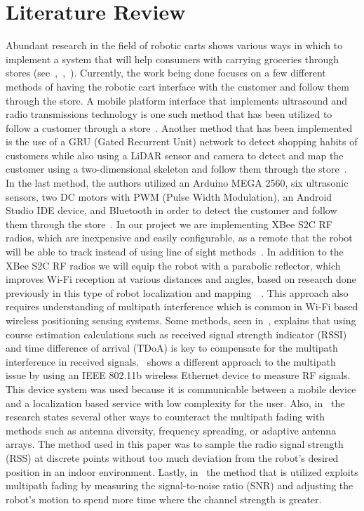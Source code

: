\documentclass[letterpaper,12pt]{article}   %
\begin{document}
\section{Literature Review}
Abundant research in the field of robotic carts shows various ways in which to implement a system that will help consumers with carrying groceries through stores (see~\cite{Rawashdeh2017-Person},~\cite{islam_lam_fukuda_kobayashi_kuno_2019},~\cite{Sales2016-CompaRob}). Currently, the work being done focuses on a few different methods of having the robotic cart interface with the customer and follow them through the store. A mobile platform interface that implements ultrasound and radio transmissions technology is one such method that has been utilized to follow a customer through a store~\cite{Sales2016-CompaRob}. Another method that has been implemented is the use of a GRU (Gated Recurrent Unit) network to detect shopping habits of customers while also using a LiDAR sensor and camera to detect and map the customer using a two-dimensional skeleton and follow them through the store~\cite{islam_lam_fukuda_kobayashi_kuno_2019}. In the last method, the authors utilized an Arduino MEGA 2560, six ultrasonic sensors, two DC motors with PWM (Pulse Width Modulation), an Android Studio IDE device, and Bluetooth in order to detect the customer and follow them through the store~\cite{Rawashdeh2017-Person}. In our project we are implementing XBee S2C RF radios, which are inexpensive and easily configurable, as a remote that the robot will be able to track instead of using line of sight methods~\cite{Miah2018-Intelligent}. In addition to the XBee S2C RF radios we will equip the robot with a parabolic reflector, which improves Wi-Fi reception at various distances and angles, based on research done previously in this type of robot localization and mapping~\cite{Miah2018-Intelligent}~\cite{Li2013ANA}. This approach also requires understanding of multipath interference which is common in Wi-Fi based wireless positioning sensing systems. Some methods, seen in~\cite{xie_jiang_zhao_zhang_2019}, explains that using course estimation calculations such as received signal strength indicator (RSSI) and time difference of arrival (TDoA) is key to compensate for the multipath interference in received signals.~\cite{ladd_bekris_rudys_kavraki_wallach_2005} shows a different approach to the multipath issue by using an IEEE 802.11b wireless Ethernet device to measure RF signals. This device system was used because it is communicable between a mobile device and a localization based service with low complexity for the user. Also, in~\cite{lindhe_johansson_bicchi_2007} the research states several other ways to counteract the multipath fading with methods such as antenna diversity, frequency spreading, or adaptive antenna arrays. The method used in this paper was to sample the radio signal strength (RSS) at discrete points without too much deviation from the robot's desired position in an indoor environment. Lastly, in~\cite{Lindhe2009} the method that is utilized exploits multipath fading by measuring the signal-to-noise ratio (SNR) and adjusting the robot's motion to spend more time where the channel strength is greater.
\end{document}
